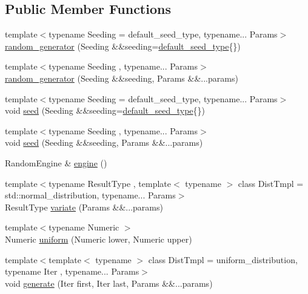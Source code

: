 \subsection*{Public Member Functions}
\begin{DoxyCompactItemize}
\item 
{\footnotesize template$<$typename Seeding  = default\+\_\+seed\+\_\+type, typename... Params$>$ }\\\hyperlink{classrandutils_1_1random__generator_abfccab3973766dbd0526bc8269f26cff}{random\+\_\+generator} (Seeding \&\&seeding=\hyperlink{classrandutils_1_1random__generator_a424b01b5232f91d42163369ad6bd3b11}{default\+\_\+seed\+\_\+type}\{\})
\item 
{\footnotesize template$<$typename Seeding , typename... Params$>$ }\\\hyperlink{classrandutils_1_1random__generator_ab706901b79a9fceb71e3ad7fd7031ae4}{random\+\_\+generator} (Seeding \&\&seeding, Params \&\&...params)
\item 
{\footnotesize template$<$typename Seeding  = default\+\_\+seed\+\_\+type, typename... Params$>$ }\\void \hyperlink{classrandutils_1_1random__generator_ae25cea4c3bd86714fb8f2c2135842e68}{seed} (Seeding \&\&seeding=\hyperlink{classrandutils_1_1random__generator_a424b01b5232f91d42163369ad6bd3b11}{default\+\_\+seed\+\_\+type}\{\})
\item 
{\footnotesize template$<$typename Seeding , typename... Params$>$ }\\void \hyperlink{classrandutils_1_1random__generator_a05fa4e4dba44982912c32562dc8e16d8}{seed} (Seeding \&\&seeding, Params \&\&...params)
\item 
Random\+Engine \& \hyperlink{classrandutils_1_1random__generator_a85303ed792296a49a8f395fb3a71c2ed}{engine} ()
\item 
{\footnotesize template$<$typename Result\+Type , template$<$ typename $>$ class Dist\+Tmpl = std\+::normal\+\_\+distribution, typename... Params$>$ }\\Result\+Type \hyperlink{classrandutils_1_1random__generator_a4aed9ef9fe1695d08b9b30891f1127b3}{variate} (Params \&\&...params)
\item 
{\footnotesize template$<$typename Numeric $>$ }\\Numeric \hyperlink{classrandutils_1_1random__generator_a122935c5a83df7f584d7120c64c732bc}{uniform} (Numeric lower, Numeric upper)
\item 
{\footnotesize template$<$template$<$ typename $>$ class Dist\+Tmpl = uniform\+\_\+distribution, typename Iter , typename... Params$>$ }\\void \hyperlink{classrandutils_1_1random__generator_aa0e413e887ea03dfd1653d0b071f70bf}{generate} (Iter first, Iter last, Params \&\&...params)

\end{DoxyCompactItemize}
